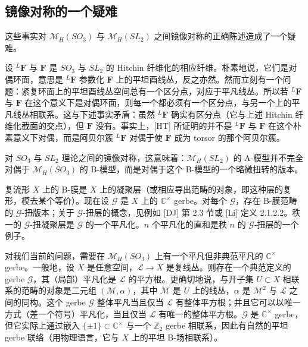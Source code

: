 \subsection{镜像对称的一个疑难}

这些事实对 $\mathcal{M}_H(SO_3)$ 与 $\mathcal{M}_H(SL_2)$ 之间镜像对称的正确陈述造成了一个疑难。

设 ${}^{L}\boldsymbol{F}$ 与 $\boldsymbol{F}$ 是 $SO_3$ 与 $SL_2$ 的 Hitchin 纤维化的相应纤维。朴素地说，它们是对偶环面，意思是 ${}^{L}\boldsymbol{F}$ 参数化 $\boldsymbol{F}$ 上的平坦酉线丛，反之亦然。然而立刻有一个问题：紧复环面上的平坦酉线丛空间总有一个区分点，对应于平凡线丛。所以若 ${}^{L}\boldsymbol{F}$ 与 $\boldsymbol{F}$ 在这个意义下是对偶环面，则每一个都必须有一个区分点，与另一个上的平凡线丛相联系。这与下述事实矛盾：虽然 ${}^{L}\boldsymbol{F}$ 确实有区分点（它与上述 Hitchin 纤维化截面的交点），但 $\boldsymbol{F}$ 没有。事实上，[HT] 所证明的并不是 ${}^{L}\boldsymbol{F}$ 与 $\boldsymbol{F}$ 在这个朴素意义下对偶，而是阿贝尔簇 ${}^{L}\boldsymbol{F}$ 对偶于使 $\boldsymbol{F}$ 成为 torsor 的那个阿贝尔簇。


对 $SO_3$ 与 $SL_2$ 理论之间的镜像对称，这意味着：$\mathcal{M}_H(SL_2)$ 的 A-模型并不完全对偶于 $\mathcal{M}_H(SO_3)$ 的 B-模型，而是对偶于这个 B-模型的一个略微扭转的版本。

复流形 $X$ 上的 B-膜是 $X$ 上的凝聚层（或相应导出范畴的对象，即这种层的复形，模去某个等价）。现在设 $\mathcal{G}$ 是 $X$ 上的 $\mathbb{C}^\times$ gerbe。对每个 $\mathcal{G}$，存在 B-膜范畴的 $\mathcal{G}$-扭版本；关于 $\mathcal{G}$-扭层的概念，见例如 [DJ] 第 2.3 节或 [Li] 定义 2.1.2.2。秩一的 $\mathcal{G}$-扭凝聚层是 $\mathcal{G}$ 的一个平凡化。$n$ 个平凡化的直和是秩 $n$ 的 $\mathcal{G}$-扭层的一个例子。

对我们当前的问题，需要在 $\mathcal{M}_H(SO_3)$ 上有一个平凡但非典范平凡的 $\mathbb{C}^\times$ gerbe。一般地，设 $X$ 是任意空间，$\mathcal{L}\to X$ 是复线丛。则存在一个典范定义的 gerbe $\mathcal{G}$，其（局部）平凡化是 $\mathcal{L}$ 的平方根。更确切地说，与开子集 $U\subset X$ 相联系的范畴的对象是二元组 $(\mathcal{M},\alpha)$，其中 $\mathcal{M}$ 是 $U$ 上的线丛，$\alpha$ 是 $\mathcal{M}^2$ 与 $\mathcal{L}$ 之间的同构。这个 gerbe $\mathcal{G}$ 整体平凡当且仅当 $\mathcal{L}$ 有整体平方根；并且它可以以唯一方式（差一个符号）平凡化，当且仅当 $\mathcal{L}$ 有唯一的整体平方根。$\mathcal{G}$ 是 $\mathbb{C}^\times$ gerbe，但它实际上通过嵌入 $\{\pm1\}\subset\mathbb{C}^\times$ 与一个 $\mathbb{Z}_2$ gerbe 相联系，因此有自然的平坦 gerbe 联络（用物理语言，它与 $X$ 上的平坦 B-场相联系）。

